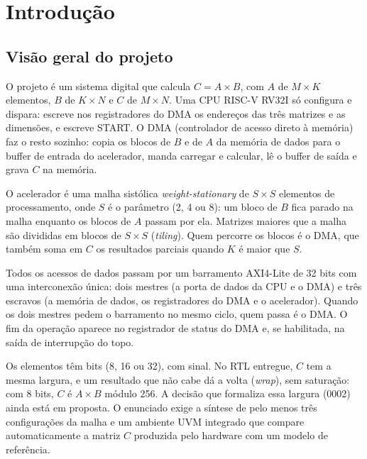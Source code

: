 \documentclass[10pt,a4paper]{article}
\newcommand{\code}[1]{\texttt{\detokenize{#1}}}
\begin{document}
\section{Introdução}

\subsection{Visão geral do projeto}

O projeto é um sistema digital que calcula $C = A \times B$, com $A$ de $M \times K$ elementos, $B$
de $K \times N$ e $C$ de $M \times N$. Uma CPU RISC-V RV32I só configura e dispara: escreve nos
registradores do DMA os endereços das três matrizes e as dimensões, e escreve START. O DMA
(controlador de acesso direto à memória) faz o resto sozinho: copia os blocos de $B$ e de $A$ da
memória de dados para o buffer de entrada do acelerador, manda carregar e calcular, lê o buffer de
saída e grava $C$ na memória.

O acelerador é uma malha sistólica \emph{weight-stationary} de $S \times S$ elementos de
processamento, onde $S$ é o parâmetro \code{ARRAY_SIZE} (2, 4 ou 8): um bloco de $B$ fica parado
na malha enquanto os blocos de $A$ passam por ela. Matrizes maiores que a malha são divididas em
blocos de $S \times S$ (\emph{tiling}). Quem percorre os blocos é o DMA, que também soma em $C$ os
resultados parciais quando $K$ é maior que $S$.

Todos os acessos de dados passam por um barramento AXI4-Lite de 32 bits com uma interconexão única:
dois mestres (a porta de dados da CPU e o DMA) e três escravos (a memória de dados, os registradores
do DMA e o acelerador). Quando os dois mestres pedem o barramento no mesmo ciclo, quem passa é o
DMA. O fim da operação aparece no registrador de status do DMA e, se habilitada, na saída de
interrupção \code{irq_o} do topo.

Os elementos têm \code{DATA_WIDTH} bits (8, 16 ou 32), com sinal. No RTL entregue, $C$ tem a
mesma largura, e um resultado que não cabe dá a volta (\emph{wrap}), sem saturação: com 8 bits,
$C$ é $A \times B$ módulo 256. A decisão que formaliza essa largura (0002) ainda está em proposta.
O enunciado exige a síntese de pelo menos três configurações da malha e um
ambiente UVM integrado que compare automaticamente a matriz $C$ produzida pelo hardware com um
modelo de referência.
\end{document}

